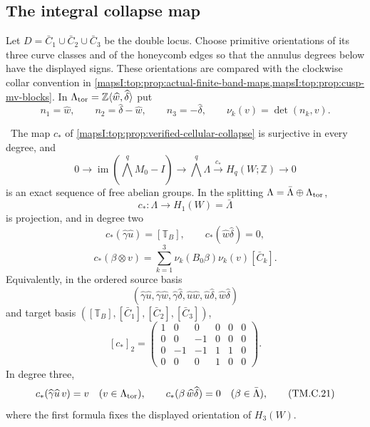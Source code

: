 \subsection{The integral collapse map}

Let $D=\bar C_1\cup\bar C_2\cup\bar C_3$ be the double locus.  Choose
primitive orientations of its three curve classes and of the honeycomb edges
so that the annulus degrees below have the displayed signs.  These orientations
are compared with the clockwise collar convention in
\cref{mapsI:top:prop:actual-finite-band-maps,mapsI:top:prop:cusp-mv-blocks}.  In
$\Lambda_{\rm tor}=\mathbb Z\langle\widehat w,\widehat\delta\rangle$ put
\[
 n_1=\widehat w,\qquad n_2=\widehat\delta-\widehat w,\qquad
 n_3=-\widehat\delta,\qquad
 \nu_k(v)=\det(n_k,v).
\tag{TM.C.16}
\]

\begin{proposition}
\label{mapsI:top:prop:verified-collapse-homology}
\ The map $c_*$ of \cref{mapsI:top:prop:verified-cellular-collapse} is
surjective in every degree, and
\[
 0\longrightarrow\operatorname{im}(\textstyle\bigwedge^qM_0-I)
 \longrightarrow\textstyle\bigwedge^q\Lambda
 \xrightarrow{c_*}H_q(W;\mathbb Z)\longrightarrow0
\tag{TM.C.17}
\]
is an exact sequence of free abelian groups.  In the splitting
$\Lambda=\bar\Lambda\oplus\Lambda_{\rm tor}$,
\[
 c_*:\Lambda\to H_1(W)=\bar\Lambda
\]
is projection, and in degree two
\[
 c_*(\widehat\gamma\widehat u)=[\mathbb T_B],\qquad
 c_*(\widehat w\widehat\delta)=0,
\tag{TM.C.18}
\]
\[
 c_*(\beta\otimes v)=
 \sum_{k=1}^3\nu_k(B_0\beta)\nu_k(v)[\bar C_k].
\tag{TM.C.19}
\]
Equivalently, in the ordered source basis
\[
(\widehat\gamma\widehat u,\widehat\gamma\widehat w,
 \widehat\gamma\widehat\delta,\widehat u\widehat w,
 \widehat u\widehat\delta,\widehat w\widehat\delta)
\]
and target basis
$([\mathbb T_B],[\bar C_1],[\bar C_2],[\bar C_3])$,
\[
[c_*]_2=
\begin{pmatrix}
1&0&0&0&0&0\\
0&0&-1&0&0&0\\
0&-1&-1&1&1&0\\
0&0&0&1&0&0
\end{pmatrix}.
\tag{TM.C.20}
\]
In degree three,
\[
 c_*(\widehat\gamma\widehat u\,v)=v
 \quad(v\in\Lambda_{\rm tor}),
 \qquad
 c_*(\beta\,\widehat w\widehat\delta)=0
 \quad(\beta\in\bar\Lambda),
\tag{TM.C.21}
\]
where the first formula fixes the displayed orientation of $H_3(W)$.
\end{proposition}

